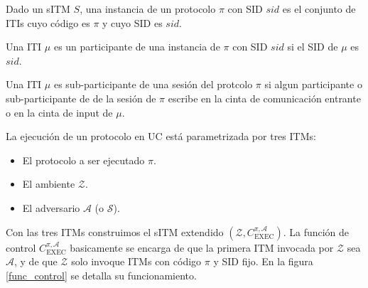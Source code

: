 \begin{definicion}
Dado un sITM $S$, una instancia de un protocolo $\pi$ con SID $sid$ es el conjunto de ITIs
cuyo código es $\pi$ y cuyo SID es $sid$.
\end{definicion}

\begin{definicion}[Participante]
Una ITI $\mu$ es un participante de una instancia de $\pi$ con SID $sid$ si el SID de $\mu$ es $sid$.
\end{definicion}

\begin{definicion}
Una ITI $\mu$ es sub-participante de una sesión del protcolo $\pi$ si algun participante o sub-participante
de de la sesión de $\pi$ escribe en la cinta de comunicación entrante o en la cinta de input de $\mu$.
\end{definicion}

La ejecución de un protocolo en UC está parametrizada por tres ITMs:

\begin{itemize}
    \item El protocolo a ser ejecutado $\pi$.
    \item El ambiente $\mathcal{Z}$.
    \item El adversario $\mathcal{A}$ (o $\mathcal{S}$).
\end{itemize}

Con las tres ITMs construimos el sITM  extendido $(\mathcal{Z}, C^{\pi, \mathcal{A}}_\mathrm{EXEC})$.
La función de control $C^{\pi, \mathcal{A}}_\mathrm{EXEC}$ basicamente se encarga de que la primera ITM
invocada por $\mathcal{Z}$ sea $\mathcal{A}$, y de que $\mathcal{Z}$ solo invoque ITMs con código $\pi$ y
SID fijo. En la figura \ref{func_control} se detalla su funcionamiento.

